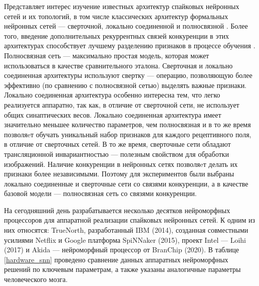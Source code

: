 \documentclass[a4paper]{article}
\begin{document}
Представляет интерес изучение известных архитектур спайковых нейронных сетей и их топологий, в том числе классических архитектур формальных нейронных сетей --- сверточной, локально соединенной и полносвязной \cite{Khan_2020}. Более того, введение дополнительных рекуррентных связей конкуренции в этих архитектурах способствует лучшему разделению признаков в  процессе обучения \cite{MaxActiv1, MaxActiv2}. Полносвязная сеть --- максимально простая модель, которая может использоваться в качестве сравнительного эталона. Сверточная и локально соединенная архитектуры используют свертку --- операцию, позволяющую более эффективно (по сравнению с полносвязной сетью) выделять важные признаки. Локально соединенная архитектура особенно интересна тем, что легко реализуется аппаратно, так как, в отличие от сверточной сети, не использует общих синаптических весов. Локально соединенная архитектура имеет значительно меньшее количество параметров, чем полносвязная и в то же время позволяeт обучать уникальный набор признаков для каждого рецептивного поля, в отличие от сверточных сетей. В то же время, сверточные сети обладают трансляционной инвариантностью --- полезным свойством для обработки изображений. Наличие конкуренции в нейронных сетях позволяeт делать их признаки более независимыми. Поэтому для экспериментов были выбраны локально соединенные и сверточные сети со связями конкуренции, а в качестве базовой модели --- полносвязная сеть со связями конкуренции.

% 

\clearpage

На сегодняшний день разрабатывается несколько десятков нейроморфных процессоров для аппаратной реализации спайковых нейронных сетей. К одним из них относятся: TrueNorth, разработанный IBM (2014), созданная совместными усилиями Netflix и Google платформа SpiNNaker (2015), проект Intel --- Loihi (2017) и Akida --- нейроморфный процессор от BranChip (2020). В таблице \ref{hardware_snn} проведено сравнение данных аппаратных нейроморфных решений по ключевым параметрам, а также указаны аналогичные параметры человеческого мозга.
\end{document}
